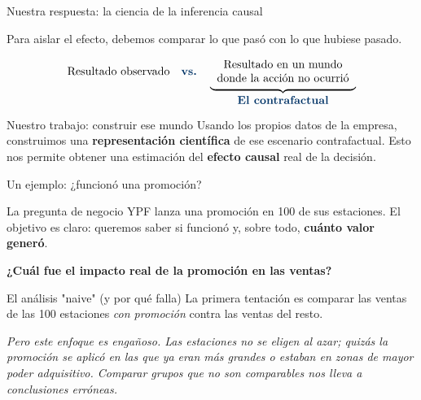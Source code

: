 \documentclass[aspectratio=169]{beamer}
\newcommand{\highlight}[1]{\textcolor{YPFBlue}{\textbf{#1}}}
\newcommand{\soft}[1]{\textcolor{SoftGray}{#1}}
\begin{document}
\begin{frame}{Nuestra respuesta: la ciencia de la inferencia causal}
\begin{center}
{\Large \soft{Para aislar el efecto, debemos comparar lo que pasó con lo que hubiese pasado.}}
\end{center}

\vspace{0.5cm}

\begin{center}
\Large
\[
\text{Resultado observado}
\quad \highlight{\text{vs.}} \quad
\underbrace{
    \begin{tabular}{c}
    Resultado en un mundo \\
    donde la acción no ocurrió
    \end{tabular}
}_{\text{\normalsize\highlight{El contrafactual}}}
\]
\end{center}

\vspace{0.5cm}

\begin{block}{Nuestro trabajo: construir ese mundo}
\justifying
Usando los propios datos de la empresa, construimos una \highlight{representación científica} de ese escenario contrafactual. Esto nos permite obtener una estimación del \highlight{efecto causal} real de la decisión.
\end{block}

\end{frame}

\begin{frame}{Un ejemplo: ¿funcionó una promoción?}

\begin{block}{La pregunta de negocio}
\justifying
YPF lanza una promoción en 100 de sus estaciones. El objetivo es claro: queremos saber si funcionó y, sobre todo, \highlight{cuánto valor generó}.
\vspace{0.2cm}
\begin{center}
    \large
    \highlight{¿Cuál fue el impacto real de la promoción en las ventas?}
\end{center}
\end{block}

\begin{block}{El análisis "naive" (y por qué falla)}
\justifying
La primera tentación es comparar las ventas de las 100 estaciones \textit{con promoción} contra las ventas del resto.
\vspace{0.3cm}

\textit{\soft{Pero este enfoque es engañoso. Las estaciones no se eligen al azar; quizás la promoción se aplicó en las que ya eran más grandes o estaban en zonas de mayor poder adquisitivo. Comparar grupos que no son comparables nos lleva a conclusiones erróneas.}}
\end{block}

\end{frame}
\end{document}
